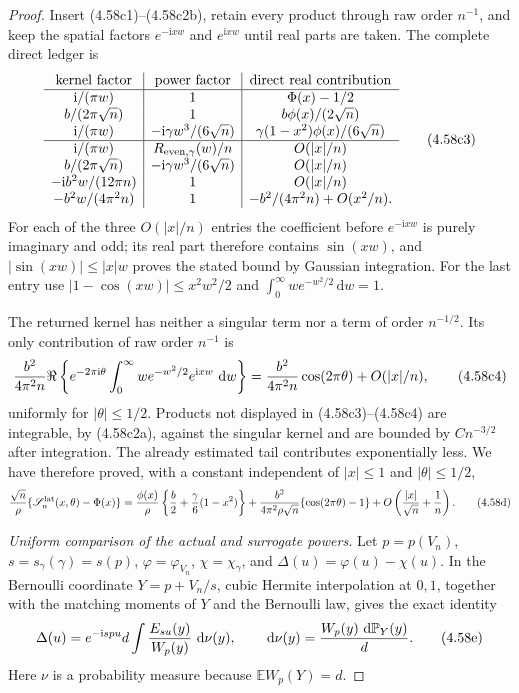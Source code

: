 \documentclass[11pt,a4paper]{article}
\numberwithin{equation}{section}
\theoremstyle{definition}
\theoremstyle{remark}
\newcommand{\E}{\mathbb E}
\newcommand{\Pp}{\mathbb P}
\newcommand{\ii}{\mathrm i}
\newcommand{\dd}{\,\mathrm d}
\begin{document}
\begin{proof}
Insert (4.58c1)--(4.58c2b), retain every product through raw order
\(n^{-1}\), and keep the spatial factors \(e^{-\ii xw}\) and
\(e^{\ii xw}\) until real parts are taken.  The complete direct ledger is
\[
\begin{array}{c|c|c}
\text{kernel factor}&\text{power factor}&\text{direct real contribution}
\\ \hline
\ii/(\pi w)&1&\Phi(x)-1/2\\
b/(2\pi\sqrt n)&1&b\phi(x)/(2\sqrt n)\\
\ii/(\pi w)&-\ii\gamma w^3/(6\sqrt n)&
       \gamma(1-x^2)\phi(x)/(6\sqrt n)\\ \hline
\ii/(\pi w)&R_{\rm even,\gamma}(w)/n&O(|x|/n)\\
b/(2\pi\sqrt n)&-\ii\gamma w^3/(6\sqrt n)&O(|x|/n)\\
-\ii b^2w/(12\pi n)&1&O(|x|/n)\\
-b^2w/(4\pi^2n)&1&-b^2/(4\pi^2n)+O(x^2/n).
\end{array}                                                     \tag{4.58c3}
\]
For each of the three \(O(|x|/n)\) entries the coefficient before
\(e^{-\ii xw}\) is purely imaginary and odd; its real part therefore
contains \(\sin(xw)\), and
\(|\sin(xw)|\le |x|w\) proves the stated bound by Gaussian integration.
For the last entry use
\(|1-\cos(xw)|\le x^2w^2/2\) and
\(\int_0^\infty we^{-w^2/2}\dd w=1\).

The returned kernel has neither a singular term nor a term of order
\(n^{-1/2}\).  Its only contribution of raw order \(n^{-1}\) is
\[
 {b^2\over4\pi^2n}\Re\left\{e^{-2\pi\ii\theta}
   \int_0^\infty we^{-w^2/2}e^{\ii xw}\,\dd w\right\}
 ={b^2\over4\pi^2n}\cos(2\pi\theta)+O(|x|/n),       \tag{4.58c4}
\]
uniformly for \(|\theta|\le1/2\).  Products not displayed in
(4.58c3)--(4.58c4) are integrable, by (4.58c2a), against the singular
kernel and are bounded by \(Cn^{-3/2}\) after integration.  The already
estimated tail contributes exponentially less.  We have therefore proved,
with a constant independent of \(|x|\le1\) and
\(|\theta|\le1/2\),
\[
 {\sqrt n\over\rho}\{\mathscr S_n^{\rm lat}(x,\theta)-\Phi(x)\}
 ={\phi(x)\over\rho}\left\{{b\over2}
             +{\gamma\over6}(1-x^2)\right\}
 +{b^2\over4\pi^2\rho\sqrt n}\{\cos(2\pi\theta)-1\}
 +O\left({|x|\over\sqrt n}+{1\over n}\right).       \tag{4.58d}
\]

\emph{Uniform comparison of the actual and surrogate powers.}
Let \(p=p(V_n)\), \(s=s_\gamma(\gamma)=s(p)\),
\(\varphi=\varphi_{V_n}\), \(\chi=\chi_\gamma\), and
\(\Delta(u)=\varphi(u)-\chi(u)\).  In the Bernoulli coordinate
\(Y=p+V_n/s\), cubic Hermite interpolation at \(0,1\), together with the
matching moments of \(Y\) and the Bernoulli law, gives the exact identity
\[
 \Delta(u)=e^{-\ii spu}d\int {E_{su}(y)\over W_p(y)}\,\dd\nu(y),
 \qquad \dd\nu(y)={W_p(y)\,\dd\Pp_Y(y)\over d}.       \tag{4.58e}
\]
Here \(\nu\) is a probability measure because
\(\E W_p(Y)=d\).


\end{proof}
\end{document}
